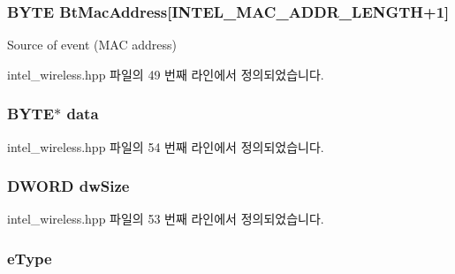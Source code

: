 \subsubsection[{\texorpdfstring{Bt\+Mac\+Address}{BtMacAddress}}]{\setlength{\rightskip}{0pt plus 5cm}B\+Y\+TE Bt\+Mac\+Address\mbox{[}{\bf I\+N\+T\+E\+L\+\_\+\+M\+A\+C\+\_\+\+A\+D\+D\+R\+\_\+\+L\+E\+N\+G\+TH}+1\mbox{]}}\hypertarget{struct_i_n_t_e_l___e_v_e_n_t_a0fd0944150b35bbbb46236f7dfca2120}{}\label{struct_i_n_t_e_l___e_v_e_n_t_a0fd0944150b35bbbb46236f7dfca2120}


Source of event (M\+AC address) 



intel\+\_\+wireless.\+hpp 파일의 49 번째 라인에서 정의되었습니다.

\subsubsection[{\texorpdfstring{data}{data}}]{\setlength{\rightskip}{0pt plus 5cm}B\+Y\+TE$\ast$ data}\hypertarget{struct_i_n_t_e_l___e_v_e_n_t_a3d1ef01c0aa6dd4984364db3f2d26fd2}{}\label{struct_i_n_t_e_l___e_v_e_n_t_a3d1ef01c0aa6dd4984364db3f2d26fd2}


intel\+\_\+wireless.\+hpp 파일의 54 번째 라인에서 정의되었습니다.

\subsubsection[{\texorpdfstring{dw\+Size}{dwSize}}]{\setlength{\rightskip}{0pt plus 5cm}D\+W\+O\+RD dw\+Size}\hypertarget{struct_i_n_t_e_l___e_v_e_n_t_a669c5a85f5a9eb97e64ad880fadaaa2d}{}\label{struct_i_n_t_e_l___e_v_e_n_t_a669c5a85f5a9eb97e64ad880fadaaa2d}


intel\+\_\+wireless.\+hpp 파일의 53 번째 라인에서 정의되었습니다.

\subsubsection[{\texorpdfstring{e\+Type}{eType}}]{ e\+Type}\hypertarget{struct_i_n_t_e_l___e_v_e_n_t_adfd2791bfb7c2d0237bbe21117619d0b}{}\label{struct_i_n_t_e_l___e_v_e_n_t_adfd2791bfb7c2d0237bbe21117619d0b}


